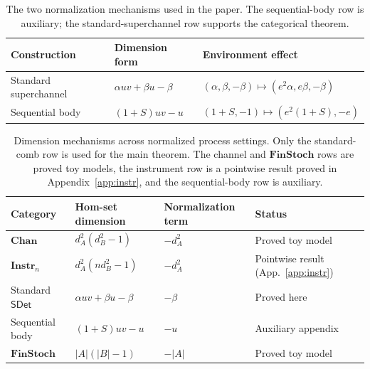 \documentclass[11pt,a4paper]{article}
\theoremstyle{definition}
\theoremstyle{plain}
\theoremstyle{remark}
\newcommand{\SDet}{\mathsf{SDet}}
\begin{document}
\begin{table}[ht]
\centering
\begin{tabular}{lll}
\toprule
Construction & Dimension form & Environment effect\\
\midrule
Standard superchannel & $\alpha uv+\beta u-\beta$ & $(\alpha,\beta,-\beta)\mapsto(e^2\alpha,e\beta,-\beta)$\\
Sequential body & $(1+S)uv-u$ & $(1+S,-1)\mapsto(e^2(1+S),-e)$\\
\bottomrule
\end{tabular}
\caption{The two normalization mechanisms used in the paper. The sequential-body row is auxiliary; the standard-superchannel row supports the categorical theorem.}
\label{tab:mechanisms}
\end{table}

\begin{table}[ht]
\centering
\begin{tabular}{llll}
\toprule
Category & Hom-set dimension & Normalization term & Status\\
\midrule
$\mathbf{Chan}$ & $d_A^2(d_B^2-1)$ & $-d_A^2$ & Proved toy model\\
$\mathbf{Instr}_n$ & $d_A^2(nd_B^2-1)$ & $-d_A^2$ & Pointwise result (App.~\ref{app:instr})\\
Standard $\SDet$ & $\alpha uv+\beta u-\beta$ & $-\beta$ & Proved here\\
Sequential body & $(1+S)uv-u$ & $-u$ & Auxiliary appendix\\
$\mathbf{FinStoch}$ & $|A|(|B|-1)$ & $-|A|$ & Proved toy model\\
\bottomrule
\end{tabular}
\caption{Dimension mechanisms across normalized process settings. Only the standard-comb row is used for the main theorem. The channel and $\mathbf{FinStoch}$ rows are proved toy models, the instrument row is a pointwise result proved in Appendix~\ref{app:instr}, and the sequential-body row is auxiliary.}
\label{tab:comparative}
\end{table}
\end{document}
